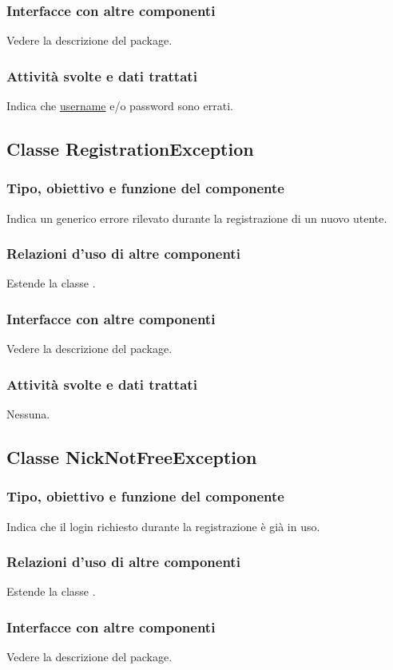 \subsubsection*{Interfacce con altre componenti}
Vedere la descrizione del package.
\subsubsection*{Attivit\`a svolte e dati trattati}
Indica che \underline{username} e/o password sono errati.

\subsection{Classe RegistrationException}
\subsubsection*{Tipo, obiettivo e funzione del componente}
Indica un generico errore rilevato durante la registrazione di un nuovo utente.
\subsubsection*{Relazioni d'uso di altre componenti}
Estende la classe .
\subsubsection*{Interfacce con altre componenti}
Vedere la descrizione del package.
\subsubsection*{Attivit\`a svolte e dati trattati}
Nessuna.

\subsection{Classe NickNotFreeException}
\subsubsection*{Tipo, obiettivo e funzione del componente}
Indica che il login richiesto durante la registrazione \`e gi\`a in uso.
\subsubsection*{Relazioni d'uso di altre componenti}
Estende la classe .
\subsubsection*{Interfacce con altre componenti}
Vedere la descrizione del package.
